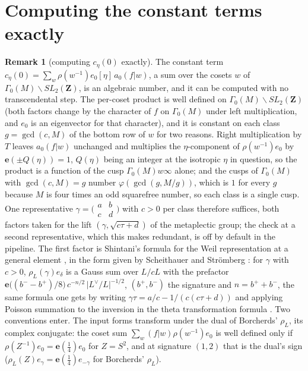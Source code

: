 \documentclass[11pt,reqno]{amsart}
\theoremstyle{plain}
\theoremstyle{definition}
\newtheorem{remark}[theorem]{Remark}
\newcommand{\Ldual}{L^{\vee}}
\begin{document}
\section{Computing the constant terms exactly}
\begin{remark}[computing $c_\eta(0)$ exactly]\label{rem:exact}
The constant term $c_\eta(0)=\sum_w\rho(w^{-1})e_0[\eta]\,a_0(f|w)$, a sum over the cosets $w$ of
$\Gamma_0(M)\backslash SL_2(\mathbf Z)$, is an algebraic number, and it can be computed with no
transcendental step. The per-coset product is well defined on $\Gamma_0(M)\backslash SL_2(\mathbf Z)$
(both factors change by the character of $f$ on $\Gamma_0(M)$ under left multiplication, and $e_0$ is
an eigenvector for that character), and it is constant on each class $g=\gcd(c,M)$ of the bottom row
of $w$ for two reasons. Right multiplication by $T$ leaves $a_0(f|w)$ unchanged and multiplies the
$\eta$-component of $\rho(w^{-1})e_0$ by $\mathbf e(\pm Q(\eta))=1$, $Q(\eta)$ being an integer at
the isotropic $\eta$ in question, so the product is a function of the cusp $\Gamma_0(M)w\infty$ alone;
and the cusps of $\Gamma_0(M)$ with $\gcd(c,M)=g$ number $\varphi(\gcd(g,M/g))$, which is $1$ for
every $g$ because $M$ is four times an odd squarefree number, so each class is a single cusp. One
representative $\gamma=\bigl(\begin{smallmatrix}a&b\\c&d\end{smallmatrix}\bigr)$ with $c>0$ per
class therefore suffices, both factors taken for the lift $(\gamma,\sqrt{c\tau+d})$ of the metaplectic
group; the check at a second representative, which this makes redundant, is off by default in the
pipeline. The first factor is Shintani's formula for the Weil representation at a general element
\cite[Prop.~1.6]{Shintani}, in the form given by Scheithauer \cite[Thm.~4.7]{Scheithauer} and
Str\"omberg \cite{Stromberg}: for $\gamma$ with $c>0$, $\rho_L(\gamma)e_\delta$ is a Gauss sum over
$L/cL$ with the prefactor $\mathbf e\bigl((b^--b^+)/8\bigr)\,c^{-n/2}\,\lvert\Ldual/L\rvert^{-1/2}$,
$(b^+,b^-)$ the signature and $n=b^++b^-$, the same formula one gets by writing
$\gamma\tau=a/c-1/(c(c\tau+d))$ and applying Poisson summation to the inversion in the theta
transformation formula \cite[Thm.~4.1]{Borcherds}. Two conventions enter. The input forms transform
under the dual of Borcherds' $\rho_L$, its complex conjugate: the coset sum $\sum_w(f|w)\rho(w^{-1})e_0$
is well defined only if $\rho(Z^{-1})e_0=\mathbf e(\tfrac14)e_0$ for $Z=S^2$, and at signature $(1,2)$
that is the dual's sign ($\rho_L(Z)e_\gamma=\mathbf e(\tfrac14)e_{-\gamma}$ for Borcherds' $\rho_L$).

\end{remark}
\end{document}
